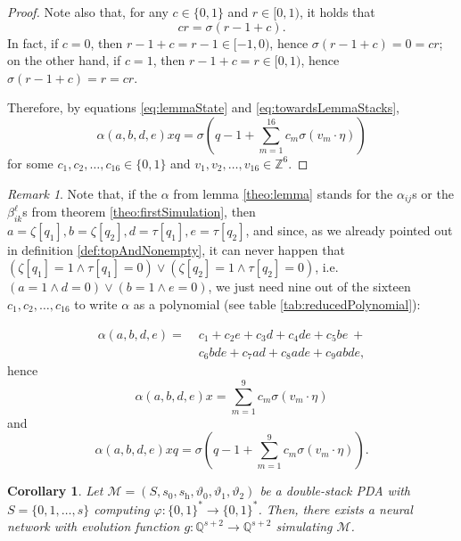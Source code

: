 \documentclass{book}
\newcommand{\Q}{\mathbb{Q}}
\newcommand{\h}{\mathrm{h}}
\theoremstyle{definition}
\theoremstyle{plain}
\newcounter{theoremCounter}
\theoremstyle{plain}
\theoremstyle{remark}
\newtheorem{remark}{Remark}[theorem]
\theoremstyle{plain}
\newtheorem{corollary}{Corollary}[theorem]
\begin{document}
\begin{proof}
		Note also that, for any $c\in\{0,1\}$ and $r\in[0,1)$, it holds that 
		\begin{equation} \label{eq:towardsLemmaStacks}
		cr=\sigma(r-1+c).
		\end{equation}
		In fact, if $c=0$, then $r-1+c=r-1\in[-1,0)$, hence $\sigma(r-1+c)=0=cr$; on the other hand, if $c=1$, then $r-1+c=r\in[0,1)$, hence $\sigma(r-1+c)=r=cr$.
		
		Therefore, by equations \ref{eq:lemmaState} and \ref{eq:towardsLemmaStacks},
		$$
			\alpha(a,b,d,e)xq=\sigma\!\left(q-1+\sum_{m=1}^{16}c_m\sigma(v_m\cdot\eta)\right)
		$$
		for some $c_1,c_2,\dots,c_{16}\in\{0,1\}$ and $v_1,v_2,\dots,v_{16}\in\mathbb{Z}^6$.
	\end{proof}
	
	\begin{remark} \label{theo:9not16}
		Note that, if the $\alpha$ from lemma \ref{theo:lemma} stands for the $\alpha_{ij}$s or the $\beta_{ik}^\ell$s from theorem \ref{theo:firstSimulation}, then $a=\zeta[q_1],b=\zeta[q_2],d=\tau[q_1],e=\tau[q_2]$, and since, as we already pointed out in definition \ref{def:topAndNonempty}, it can never happen that $(\zeta[q_1]=1\land\tau[q_1]=0)\lor(\zeta[q_2]=1\land\tau[q_2]=0)$, i.e. $(a=1\land d=0)\lor(b=1\land e=0)$, we just need nine out of the sixteen $c_1,c_2,\dots,c_{16}$ to write $\alpha$ as a polynomial (see table \ref{tab:reducedPolynomial}):
		
		\begin{align*}
			\alpha(a,b,d,e)=\;&c_1+c_2e+c_3d+c_4de+c_5be\:+ \\
							  &c_6bde+c_7ad+c_8ade+c_9abde,
		\end{align*}
		hence
		\begin{equation}
			\alpha(a,b,d,e)x=\sum_{m=1}^{9}c_m\sigma(v_m\cdot\eta) \label{eq:reducedLemmaState}
		\end{equation}
		and
		$$
			\alpha(a,b,d,e)xq=\sigma\!\left(q-1+\sum_{m=1}^{9}c_m\sigma(v_m\cdot\eta)\right).
		$$
	\end{remark}
	
	\setcounter{theorem}{\thetheoremCounter}
	\begin{corollary} \label{theo:secondSimulation}
		Let $\mathcal{M}=(S,s_0,s_\h,\vartheta_0,\vartheta_1,\vartheta_2)$ be a double-stack PDA with $S=\{0,1,\dots,s\}$ computing $\varphi:\{0,1\}^*\to\{0,1\}^*$. Then, there exists a neural network with evolution function $g:\Q^{s+2}\to\Q^{s+2}$ simulating $\mathcal{M}$.
	\end{corollary}
	
\end{document}
